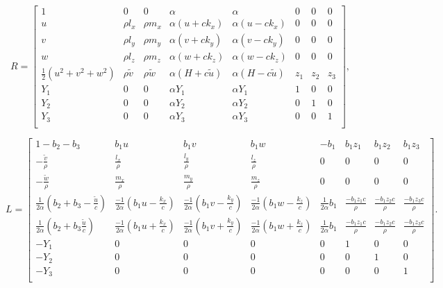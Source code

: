 \documentclass{article}
\begin{document}
\[ \begin{equation*} R= \begin{bmatrix} 1 & 0 & 0 & \alpha & \alpha & 0 & 0 & 0\\ u & \rho l_x& \rho m_x & \alpha (u+c k_x) & \alpha (u-c k_x) & 0 & 0 & 0\\ v & \rho l_y & \rho m_y & \alpha (v+c k_y) & \alpha (v-c k_y) & 0 & 0 & 0\\ w & \rho l_z & \rho m_z & \alpha (w+c k_z) & \alpha (w-c k_z)& 0 & 0 & 0 \\ \frac{1}{2}(u^2+v^2+w^2) & \rho \tilde{v} & \rho \tilde{w} &\alpha (H+c \tilde{u}) & \alpha (H-c \tilde{u} )& z_1 & z_2 & z_3\\ Y_1 & 0 & 0 & \alpha Y_1 & \alpha Y_1 & 1 & 0 & 0\\ Y_2 & 0 & 0 & \alpha Y_2 & \alpha Y_2& 0 & 1 & 0\\ Y_3 & 0 & 0 & \alpha Y_3 & \alpha Y_3 & 0 & 0 & 1\\ \end{bmatrix}, \end{equation*} \]
\pagebreak

\[ \begin{equation*} L= \begin{bmatrix} 1-b_2-b_3 & b_1 u & b_1 v & b_1 w & -b_1 & b_1z_1 & b_1 z_2 & b_1 z_3\\ -\frac{\tilde{v}}{\rho} & \frac{l_x}{\rho}& \frac{l_y}{\rho}& \frac{l_z}{\rho} & 0 & 0 & 0 & 0\\ -\frac{\tilde{w}}{\rho} & \frac{m_x}{\rho}& \frac{m_y}{\rho}& \frac{m_z}{\rho} & 0 & 0 & 0 & 0\\ \frac{1}{2\alpha}\left(b_2+b_3-\frac{\tilde{u}}{c}\right)& \frac{-1}{2\alpha}\left(b_1u-\frac{k_x}{c}\right)& \frac{-1}{2\alpha}\left(b_1v-\frac{k_y}{c}\right) & \frac{-1}{2\alpha}\left(b_1w-\frac{k_z}{c}\right) & \frac{1}{2\alpha}b_1 & \frac{-b_1z_1c}{\rho} & \frac{-b_1z_2c}{\rho} & \frac{-b_1z_3c}{\rho}\\ \frac{1}{2\alpha}\left(b_2+b_3\frac{\tilde{u}}{c}\right)& \frac{-1}{2\alpha}\left(b_1u+\frac{k_x}{c}\right)& \frac{-1}{2\alpha}\left(b_1v+\frac{k_y}{c}\right) & \frac{-1}{2\alpha}\left(b_1w+\frac{k_z}{c}\right) & \frac{1}{2\alpha}b_1 & \frac{-b_1z_1c}{\rho} & \frac{-b_1z_2c}{\rho} & \frac{-b_1z_3c}{\rho}\\ -Y_1 & 0 & 0 & 0 & 0 & 1 & 0 & 0\\ -Y_2 & 0 & 0 & 0 & 0 & 0 & 1 & 0\\ -Y_3 & 0 & 0 & 0 & 0 & 0 & 0 & 1\\ \end{bmatrix}. \end{equation*} \]
\pagebreak
\end{document}
